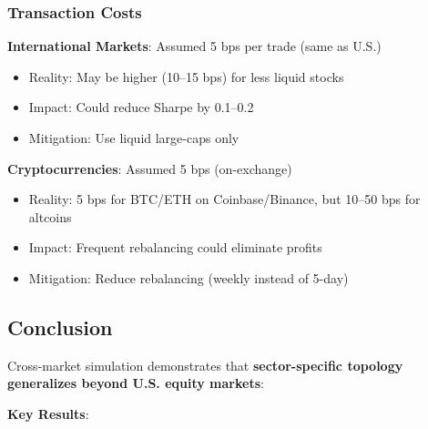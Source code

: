 \subsubsection{Transaction Costs}

\textbf{International Markets}: Assumed 5 bps per trade (same as U.S.)
\begin{itemize}
\item Reality: May be higher (10--15 bps) for less liquid stocks
\item Impact: Could reduce Sharpe by 0.1--0.2
\item Mitigation: Use liquid large-caps only
\end{itemize}

\textbf{Cryptocurrencies}: Assumed 5 bps (on-exchange)
\begin{itemize}
\item Reality: 5 bps for BTC/ETH on Coinbase/Binance, but 10--50 bps for altcoins
\item Impact: Frequent rebalancing could eliminate profits
\item Mitigation: Reduce rebalancing (weekly instead of 5-day)
\end{itemize}

\subsection{Conclusion}

Cross-market simulation demonstrates that \textbf{sector-specific topology generalizes beyond U.S. equity markets}:

\textbf{Key Results}:

